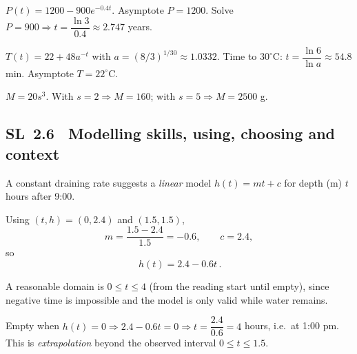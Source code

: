 \documentclass[11pt]{article}
\def\textbf#1{#1}%
\newcommand{\tocsubsection}[1]{\subsection{#1}}
\begin{document}
\begin{solution}
$P(t)=1200-900e^{-0.4t}$. Asymptote $P=1200$. Solve $P=900\Rightarrow t=\dfrac{\ln 3}{0.4}\approx2.747$ years.
\end{solution}

\begin{solution}
$T(t)=22+48a^{-t}$ with $a=(8/3)^{1/30}\approx1.0332$. Time to $30^\circ$C: $t=\dfrac{\ln 6}{\ln a}\approx54.8$ min. Asymptote $T=22^\circ$C.\\
\end{solution}

\begin{solution}
$M=20s^3$. With $s=2\Rightarrow M=160$; with $s=5\Rightarrow M=2500$ g.\\
\end{solution}




\tocsubsection{SL 2.6 \; Modelling skills, using, choosing and context}

\begin{solution}
A constant draining rate suggests a \emph{linear} model $h(t)=mt+c$ for depth (m) $t$ hours after 9:00.

Using $(t,h)=(0,2.4)$ and $(1.5,1.5)$,
\[
m=\frac{1.5-2.4}{1.5}=-0.6,\qquad c=2.4,
\]
so
\[
\boxed{\,h(t)=2.4-0.6t\,}.
\]

A reasonable domain is $0\le t\le 4$ (from the reading start until empty), since negative time is impossible and the model is only valid while water remains.

Empty when $h(t)=0\Rightarrow 2.4-0.6t=0\Rightarrow t=\dfrac{2.4}{0.6}=4$ hours,
i.e.\ at \textbf{1:00 pm}. This is \emph{extrapolation} beyond the observed interval $0\le t\le 1.5$.
\end{solution}
\end{document}

